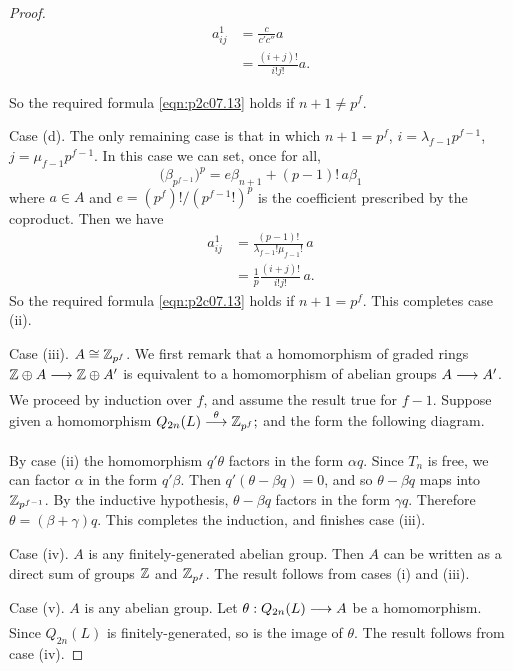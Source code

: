 \documentclass[../main]{subfiles}
\begin{document}
\begin{proof}
\begin{align*}
a_{ij}^1 & = \frac c {c' c''} a \\ & = \frac {(i + j)!} {i! j!} a.
\end{align*}

So the required formula \eqref{eqn:p2c07.13} holds if $n + 1 \ne p^f$.

Case (d). The only remaining case is that in which $n+1=p^f$, $i=\lambda_{f-1}p^{f-1}$, $j=\mu_{f-1}p^{f-1}$. In this case we can set, once for all,
\[
\big(\beta_{p^{f-1}}\big)^p=e\beta_{n+1}+(p-1)!\,a\beta_1
\]
where $a\in A$ and $e=(p^f)!/(p^{f-1}!)^p$ is the coefficient prescribed by the coproduct. Then we have
\begin{align*}
a_{ij}^1
&=\frac{(p-1)!}{\lambda_{f-1}!\mu_{f-1}!}\,a\\
&=\frac1p\frac{(i+j)!}{i!j!}\,a.
\end{align*}
So the required formula \eqref{eqn:p2c07.13} holds if $n+1=p^f$. This completes case (ii).

Case (iii). $A \cong \mathbb{Z}_{p^f}$. We first remark that a homomorphism of graded rings $\bbZ \oplus A \lar{} \bbZ \oplus A'$ is equivalent to a homomorphism of abelian groups $A \lar{} A'$. We proceed by induction over $f$, and assume the result true for $f - 1$. Suppose given a homomorphism $Q_{2n}(L) \lar{\theta} \bbZ_{p^f};$ and the form the following diagram.

\begin{center}
\end{center}

By case (ii) the homomorphism $q'\theta$ factors in the form $\alpha q$. Since $T_n$ is free, we can factor $\alpha$ in the form $q' \beta$. Then $q'(\theta - \beta q) = 0$, and so $\theta - \beta q$ maps into $\mathbb{Z}_{p^{f - 1}}$. By the inductive hypothesis, $\theta - \beta q$ factors in the form $\gamma q$. Therefore $\theta = (\beta + \gamma)q$. This completes the induction, and finishes case (iii).

Case (iv). $A$ is any finitely-generated abelian group. Then $A$ can be written as a direct sum of groups $\mathbb{Z}$ and $\mathbb{Z}_{p^f}$. The result follows from cases (i) and (iii).

Case (v). $A$ is any abelian group. Let $\theta : Q_{2n}(L) \lar{} A$ be a homomorphism. Since $Q_{2n}(L)$ is finitely-generated, so is the image of $\theta$. The result follows from case (iv).
\end{proof}
\end{document}
